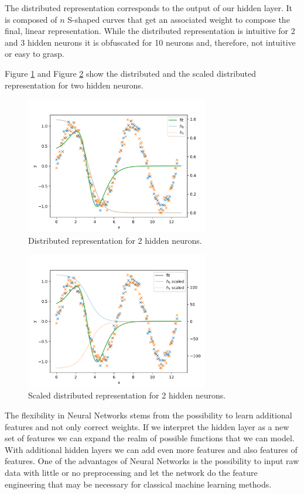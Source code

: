 \documentclass{support/acm_proc_article-sp}
\begin{document}
    The distributed representation corresponds to the output of our hidden layer.
    It is composed of $n$ S-shaped curves that get an associated weight to compose the final, linear representation.
    While the distributed representation is intuitive for 2 and 3 hidden neurons it is obfuscated for 10 neurons and, therefore,
    not intuitive or easy to grasp.

    Figure \ref{fig:distributed} and Figure \ref{fig:distributed-scaled} show the distributed and the scaled distributed
    representation for two hidden neurons.
    \begin{figure}[!htbp]
        \centering
        \includegraphics[width=8cm]{images/distributed-2-hidden.png}
        \caption{Distributed representation for 2 hidden neurons.}
        \label{fig:distributed}
    \end{figure}

    \begin{figure}[!htbp]
        \centering
        \includegraphics[width=8cm]{images/distributed-2-hidden-scaled.png}
        \caption{Scaled distributed representation for 2 hidden neurons.}
        \label{fig:distributed-scaled}
    \end{figure}

    The flexibility in Neural Networks stems from the possibility to learn additional features and not only correct
    weights.
    If we interpret the hidden layer as a new set of features we can expand the realm of possible functions that we
    can model.
    With additional hidden layers we can add even more features and also features of features.
    One of the advantages of Neural Networks is the possibility to input raw data with little or no preprocessing and let
    the network do the feature engineering that may be necessary for classical machine learning methods.


    
    
\end{document}
